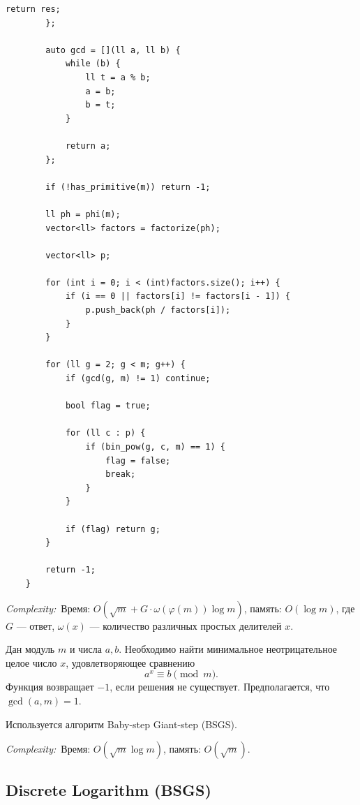 \documentclass[10pt,a4paper]{article}
\newcommand{\complexity}[1]{\textit{Complexity:}~#1}
\begin{document}
\begin{lstlisting}[style=cpp]
			return res;
		};
		
		auto gcd = [](ll a, ll b) {
			while (b) {
				ll t = a % b;
				a = b;
				b = t;
			}
			
			return a;
		};
		
		if (!has_primitive(m)) return -1;
		
		ll ph = phi(m);
		vector<ll> factors = factorize(ph);
		
		vector<ll> p;
		
		for (int i = 0; i < (int)factors.size(); i++) {
			if (i == 0 || factors[i] != factors[i - 1]) {
				p.push_back(ph / factors[i]);
			}
		}
		
		for (ll g = 2; g < m; g++) {
			if (gcd(g, m) != 1) continue;
			
			bool flag = true;
			
			for (ll c : p) {
				if (bin_pow(g, c, m) == 1) {
					flag = false;
					break;
				}
			}
			
			if (flag) return g;
		}
		
		return -1;
	}
\end{lstlisting}

\complexity{Время: $O(\sqrt m + G\cdot\omega(\varphi(m))\log m)$, память: $O(\log m)$, где $G$ — ответ, $\omega(x)$ — количество различных простых делителей $x$.}

Дан модуль $m$ и числа $a,b$. Необходимо найти минимальное
неотрицательное целое число $x$, удовлетворяющее сравнению
\[
a^x \equiv b \pmod m.
\]
Функция возвращает $-1$, если решения не существует.
Предполагается, что $\gcd(a,m)=1$.

Используется алгоритм Baby-step Giant-step (BSGS).

\complexity{Время: $O(\sqrt m\log m)$, память: $O(\sqrt m)$.}

\subsection*{Discrete Logarithm (BSGS)}
\end{document}
